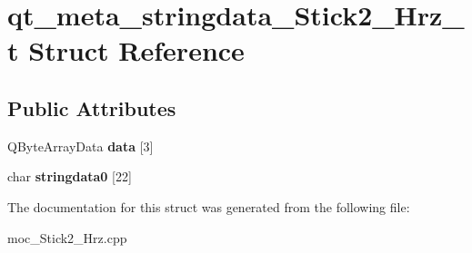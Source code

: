 \hypertarget{structqt__meta__stringdata__Stick2__Hrz__t}{}\section{qt\+\_\+meta\+\_\+stringdata\+\_\+\+Stick2\+\_\+\+Hrz\+\_\+t Struct Reference}
\label{structqt__meta__stringdata__Stick2__Hrz__t}
\subsection*{Public Attributes}
\begin{DoxyCompactItemize}
\item 
Q\+Byte\+Array\+Data {\bfseries data} \mbox{[}3\mbox{]}\hypertarget{structqt__meta__stringdata__Stick2__Hrz__t_a5c08fc4ce4a1ee7d6479fb58200c5a62}{}\label{structqt__meta__stringdata__Stick2__Hrz__t_a5c08fc4ce4a1ee7d6479fb58200c5a62}

\item 
char {\bfseries stringdata0} \mbox{[}22\mbox{]}\hypertarget{structqt__meta__stringdata__Stick2__Hrz__t_ad250c3156d93bbfd4d241363c1d90f34}{}\label{structqt__meta__stringdata__Stick2__Hrz__t_ad250c3156d93bbfd4d241363c1d90f34}

\end{DoxyCompactItemize}


The documentation for this struct was generated from the following file\+:\begin{DoxyCompactItemize}
\item 
moc\+\_\+\+Stick2\+\_\+\+Hrz.\+cpp\end{DoxyCompactItemize}
